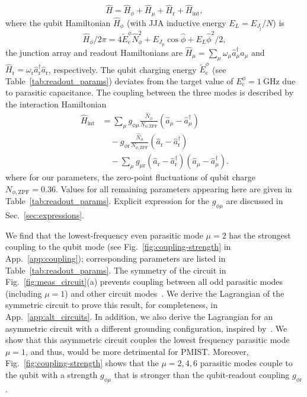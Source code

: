 \documentclass[%
reprint,
superscriptaddress,
 amsmath,amssymb,
 aps,
 prx,
longbibliography,
floatfix,
]{revtex4-2}
\begin{document}
\begin{equation}
   \hat H =\hat{H}_\phi + \hat{H}_\mu + \hat{H}_\textrm{r} + \hat{H}_{\textrm{int}},\label{Hamiltonian_total}
\end{equation}
where the qubit Hamiltonian $\hat{H}_\phi$ (with JJA inductive energy $E_L=E_{J_\textrm{j}}/N$) is 
\begin{equation}
\hat{H}_\phi / 2\pi = 4\tilde{E}^\phi_\textrm{c} \hat N_\phi^2+ E_{J_\textrm{p}}\cos{\hat\phi}+E_L\hat \phi^2 /2,\label{eq:Hphi}
\end{equation}
the junction array and readout Hamiltonians are $\hat{H}_\mu = \sum_{\mu}\omega_\mu \hat a_\mu^\dagger \hat a_\mu$ and $\hat{H}_\textrm{r} = \omega_\textrm{r} \hat a_\textrm{r}^\dagger \hat a_\textrm{r}$, respectively. The qubit charging energy
$\tilde{E}^\phi_\textrm{c}$ (see Table~\ref{tab:readout_params}) deviates from the target value of $E_{\textrm{c}}^{\phi}=1 \ \mathrm{GHz}$ due to parasitic capacitance. The coupling between the three modes is described by the interaction Hamiltonian
\begin{align}\label{eq:int_hamiltonian}
\hat{H}_{\textrm{int}} &= \sum_{\mu} g_{\phi\mu} \frac{\hat N_\phi}{{N_{\phi,\mathrm{ZPF}}}} (\hat a_\mu-\hat a_\mu^\dagger)\nonumber \\ &\quad-g_{\phi \textrm{r}} \frac{\hat N_\phi}{{N_{\phi,\mathrm{ZPF}}}} (\hat a_\textrm{r}-\hat a_\textrm{r}^\dagger) \nonumber \\&\quad- \sum_{\mu} g_{\mu \textrm{r}} (\hat a_\textrm{r}-\hat a_\textrm{r}^\dagger)(\hat a_\mu-\hat a_\mu^\dagger).
\end{align}
where for our parameters, the zero-point fluctuations of qubit charge  $N_{\phi,\mathrm{ZPF}}=0.36$. Values for all remaining parameters appearing here are given in Table~\ref{tab:readout_params}. Explicit expression for the $g_{\phi\mu}$ are discussed in Sec.~\ref{sec:expressions}.%

 
 We find that the lowest-frequency even parasitic mode $\mu=2$ has the strongest coupling to the qubit mode (see Fig.~\ref{fig:coupling-strength} in App.~\ref{app:coupling}); corresponding parameters are listed in Table~\ref{tab:readout_params}. The symmetry of the circuit in Fig.~\ref{fig:meas_circuit}(a) prevents coupling between all odd parasitic modes (including $\mu=1$) and other circuit modes~\cite{viola2015collective}. We derive the Lagrangian of the symmetric circuit to prove this result, for completeness, in App.~\ref{app:alt_circuits}. In addition, we also derive the Lagrangian for an asymmetric circuit with a different grounding configuration, inspired by~\cite{zhang_universal_2021}. We show that this asymmetric circuit couples the lowest frequency parasitic mode $\mu=1$, and thus, would be more detrimental for PMIST. Moreover, Fig.~\ref{fig:coupling-strength} shows that the $\mu=2,4,6$ parasitic modes couple to the qubit with a strength $g_{\phi\mu}$ that is stronger than the qubit-readout coupling $g_{\phi \textrm{r}}$.
 
\end{document}

